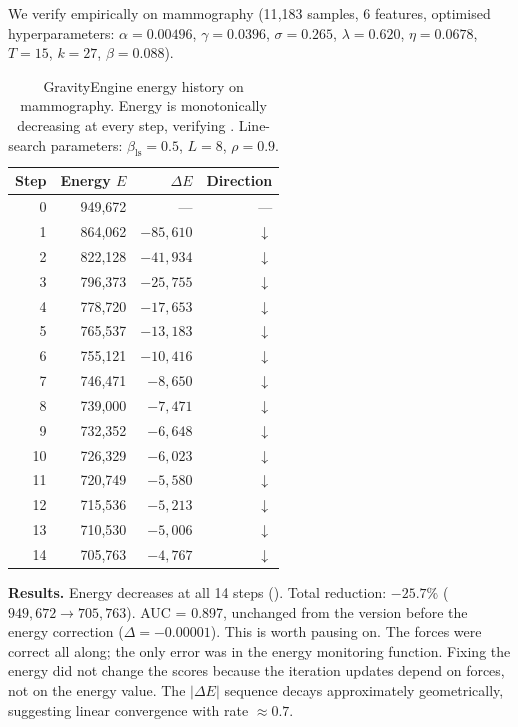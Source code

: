 \documentclass{article}
\begin{document}
We verify  empirically on mammography (11{,}183 samples, 6 features, optimised hyperparameters: $\alpha=0.00496$, $\gamma=0.0396$, $\sigma=0.265$, $\lambda=0.620$, $\eta=0.0678$, $T=15$, $k=27$, $\beta=0.088$).

\begin{table}[t]
\centering
\caption{GravityEngine energy history on mammography. Energy is monotonically decreasing at every step, verifying . Line-search parameters: $\beta_{\text{ls}}=0.5$, $L=8$, $\rho=0.9$.}
\label{tab:energy}
\begin{tabular}{@{}rrrr@{}}
\toprule
\textbf{Step} & \textbf{Energy $E$} & \textbf{$\Delta E$} & \textbf{Direction} \\
\midrule
0 & 949{,}672 & --- & --- \\
1 & 864{,}062 & $-85{,}610$ & $\downarrow$ \\
2 & 822{,}128 & $-41{,}934$ & $\downarrow$ \\
3 & 796{,}373 & $-25{,}755$ & $\downarrow$ \\
4 & 778{,}720 & $-17{,}653$ & $\downarrow$ \\
5 & 765{,}537 & $-13{,}183$ & $\downarrow$ \\
6 & 755{,}121 & $-10{,}416$ & $\downarrow$ \\
7 & 746{,}471 & $-8{,}650$ & $\downarrow$ \\
8 & 739{,}000 & $-7{,}471$ & $\downarrow$ \\
9 & 732{,}352 & $-6{,}648$ & $\downarrow$ \\
10 & 726{,}329 & $-6{,}023$ & $\downarrow$ \\
11 & 720{,}749 & $-5{,}580$ & $\downarrow$ \\
12 & 715{,}536 & $-5{,}213$ & $\downarrow$ \\
13 & 710{,}530 & $-5{,}006$ & $\downarrow$ \\
14 & 705{,}763 & $-4{,}767$ & $\downarrow$ \\
\bottomrule
\end{tabular}
\end{table}

\textbf{Results.} Energy decreases at all 14 steps (). Total reduction: $-25.7\%$ ($949{,}672 \to 705{,}763$). AUC = 0.897, unchanged from the version before the energy correction ($\Delta = -0.00001$). This is worth pausing on. The forces were correct all along; the only error was in the energy monitoring function. Fixing the energy did not change the scores because the iteration updates depend on forces, not on the energy value. The $|\Delta E|$ sequence decays approximately geometrically, suggesting linear convergence with rate $\approx 0.7$.
\end{document}
